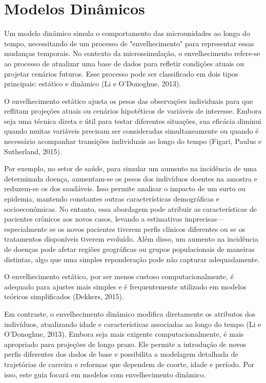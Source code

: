 \documentclass[12pt, a4paper, openany]{book}
\numberwithin{equation}{chapter}
\numberwithin{table}{chapter}
\numberwithin{figure}{chapter}
\theoremstyle{break}
\begin{document}
\chapter{Modelos Dinâmicos}\label{sec:model_din}
Um modelo dinâmico simula o comportamento das microunidades ao longo do tempo, necessitando de um processo de "envelhecimento" para representar essas mudanças temporais. No contexto da microssimulação, o envelhecimento refere-se ao processo de atualizar uma base de dados para refletir condições atuais ou projetar cenários futuros. Esse processo pode ser classificado em dois tipos principais: estático e dinâmico (Li e O'Donoghue, 2013).

O envelhecimento estático ajusta os pesos das observações individuais para que reflitam projeções atuais ou cenários hipotéticos de variáveis de interesse. Embora seja uma técnica direta e útil para testar diferentes situações, sua eficácia diminui quando muitas variáveis precisam ser consideradas simultaneamente ou quando é necessário acompanhar transições individuais ao longo do tempo (Figari, Paulus e Sutherland, 2015).

Por exemplo, no setor de saúde, para simular um aumento na incidência de uma determinada doença, aumentam-se os pesos dos indivíduos doentes na amostra e reduzem-se os dos saudáveis. Isso permite analisar o impacto de um surto ou epidemia, mantendo constantes outras características demográficas e socioeconômicas. No entanto, essa abordagem pode atribuir as características de pacientes crônicos aos novos casos, levando a estimativas imprecisas—especialmente se os novos pacientes tiverem perfis clínicos diferentes ou se os tratamentos disponíveis tiverem evoluído. Além disso, um aumento na incidência de doenças pode afetar regiões geográficas ou grupos populacionais de maneiras distintas, algo que uma simples reponderação pode não capturar adequadamente.

O envelhecimento estático, por ser menos custoso computacionalmente, é adequado para ajustes mais simples e é frequentemente utilizado em modelos teóricos simplificados (Dekkers, 2015).

Em contraste, o envelhecimento dinâmico modifica diretamente os atributos dos indivíduos, atualizando idade e características associadas ao longo do tempo (Li e O’Donoghue, 2013). Embora seja mais exigente computacionalmente, é mais apropriado para projeções de longo prazo. Ele permite a introdução de novos perfis diferentes dos dados de base e possibilita a modelagem detalhada de trajetórias de carreira e reformas que dependem de coorte, idade e período. Por isso, este guia focará em modelos com envelhecimento dinâmico.
\end{document}
